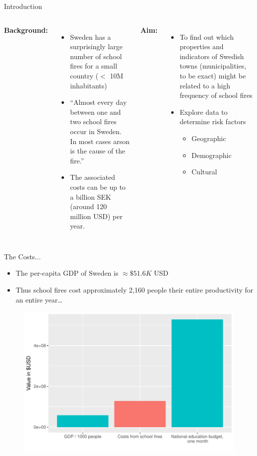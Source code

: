 \documentclass{beamer}
\begin{document}
\begin{frame}{Introduction}
\begin{columns}[T]
\textbf{Background:} \vspace{0mm}
\begin{itemize}[<2->]
\item Sweden has a surprisingly large number of school fires for a small country ($<$ 10M inhabitants)
\item ``Almost every day between one and two school fires occur in Sweden. In most cases arson is the cause of the fire.'' 
\item The associated costs can be up to a billion SEK (around 120 million USD) per year.
\end{itemize}

\textbf{Aim:} \vspace{0.85mm}
\begin{itemize}[<3->]
\item To find out which properties and indicators of Swedish towns (municipalities, to be exact) might be related to a high frequency of school fires
\item Explore data to determine risk factors
\begin{itemize}
\item Geographic
\item Demographic
\item Cultural
\end{itemize}
\end{itemize}
\end{columns}
\end{frame}

\begin{frame}{The Costs...}
\begin{itemize}
\item The per-capita GDP of Sweden is $\approx \$51.6K$ USD
\item Thus school fires cost approximately 2,160 people their entire productivity for an entire year\ldots
\end{itemize}


\begin{figure}
\centering
\includegraphics[width=.75\linewidth]{FireCosts}
\end{figure}
\end{frame}
\end{document}
